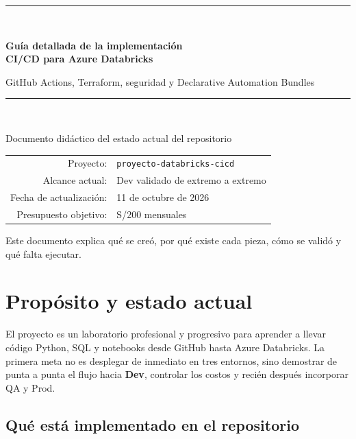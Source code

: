 \documentclass[11pt,a4paper]{article}
\begin{document}

\begin{titlepage}
  \centering
  \vspace*{2.2cm}
  {\color{dbblue}\rule{\textwidth}{1.2pt}}\\[1cm]
  {\Huge\bfseries Guía detallada de la implementación\\[0.3cm]
  CI/CD para Azure Databricks\par}
  \vspace{0.7cm}
  {\Large GitHub Actions, Terraform, seguridad y Declarative Automation Bundles\par}
  \vspace{1cm}
  {\color{dbblue}\rule{\textwidth}{1.2pt}}\\[1.5cm]
  {\large Documento didáctico del estado actual del repositorio\par}
  \vfill
  \begin{tabular}{rl}
    Proyecto: & \texttt{proyecto-databricks-cicd} \\
    Alcance actual: & Dev validado de extremo a extremo \\
    Fecha de actualización: & 11 de octubre de 2026 \\
    Presupuesto objetivo: & S/200 mensuales \\
  \end{tabular}
  \vfill
  {\small Este documento explica qué se creó, por qué existe cada pieza, cómo se validó y qué falta ejecutar.}
\end{titlepage}

\tableofcontents
\newpage
{}

\section{Propósito y estado actual}

El proyecto es un laboratorio profesional y progresivo para aprender a llevar código Python, SQL y
notebooks desde GitHub hasta Azure Databricks. La primera meta no es desplegar de inmediato en tres
entornos, sino demostrar de punta a punta el flujo hacia \textbf{Dev}, controlar los costos y recién
después incorporar QA y Prod.

\subsection{Qué está implementado en el repositorio}
\end{document}
